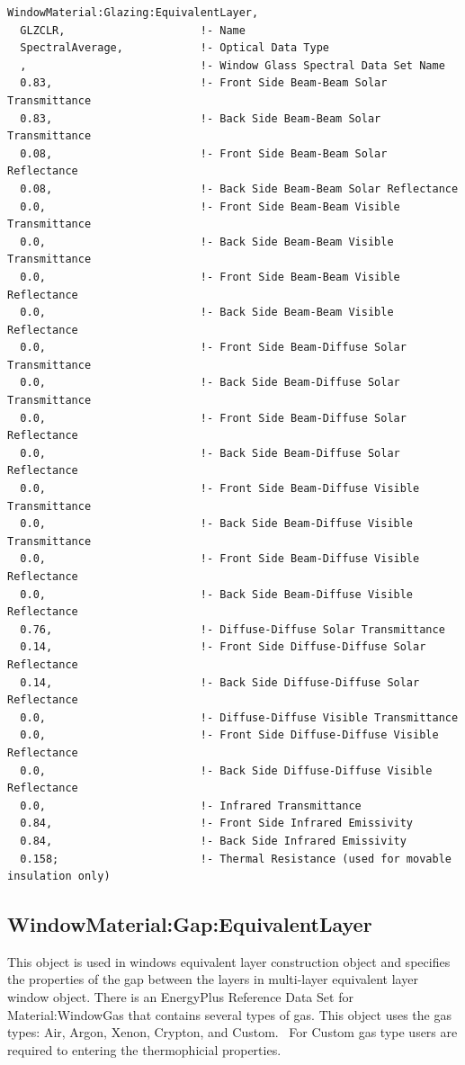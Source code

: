 \begin{lstlisting}
WindowMaterial:Glazing:EquivalentLayer,
  GLZCLR,                     !- Name
  SpectralAverage,            !- Optical Data Type
  ,                           !- Window Glass Spectral Data Set Name
  0.83,                       !- Front Side Beam-Beam Solar Transmittance
  0.83,                       !- Back Side Beam-Beam Solar Transmittance
  0.08,                       !- Front Side Beam-Beam Solar Reflectance
  0.08,                       !- Back Side Beam-Beam Solar Reflectance
  0.0,                        !- Front Side Beam-Beam Visible Transmittance
  0.0,                        !- Back Side Beam-Beam Visible Transmittance
  0.0,                        !- Front Side Beam-Beam Visible Reflectance
  0.0,                        !- Back Side Beam-Beam Visible Reflectance
  0.0,                        !- Front Side Beam-Diffuse Solar Transmittance
  0.0,                        !- Back Side Beam-Diffuse Solar Transmittance
  0.0,                        !- Front Side Beam-Diffuse Solar Reflectance
  0.0,                        !- Back Side Beam-Diffuse Solar Reflectance
  0.0,                        !- Front Side Beam-Diffuse Visible Transmittance
  0.0,                        !- Back Side Beam-Diffuse Visible Transmittance
  0.0,                        !- Front Side Beam-Diffuse Visible Reflectance
  0.0,                        !- Back Side Beam-Diffuse Visible Reflectance
  0.76,                       !- Diffuse-Diffuse Solar Transmittance
  0.14,                       !- Front Side Diffuse-Diffuse Solar Reflectance
  0.14,                       !- Back Side Diffuse-Diffuse Solar Reflectance
  0.0,                        !- Diffuse-Diffuse Visible Transmittance
  0.0,                        !- Front Side Diffuse-Diffuse Visible Reflectance
  0.0,                        !- Back Side Diffuse-Diffuse Visible Reflectance
  0.0,                        !- Infrared Transmittance
  0.84,                       !- Front Side Infrared Emissivity
  0.84,                       !- Back Side Infrared Emissivity
  0.158;                      !- Thermal Resistance (used for movable insulation only)
\end{lstlisting}

\subsection{WindowMaterial:Gap:EquivalentLayer}\label{windowmaterialgapequivalentlayer}

This object is used in windows equivalent layer construction object and specifies the properties of the gap between the layers in multi-layer equivalent layer window object. There is an EnergyPlus Reference Data Set for Material:WindowGas that contains several types of gas. This object uses the gas types: Air, Argon, Xenon, Crypton, and Custom.~ For Custom gas type users are required to entering the thermophicial properties.

